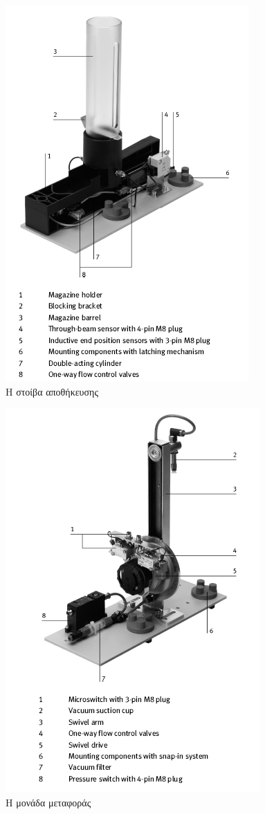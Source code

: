 \documentclass[a4paper,12pt,twoside]{report}
\begin{document}
				\begin{figure}[hp]
					\centering
					\includegraphics[scale=0.75]{StackModuleParts.png}
					\caption{Η στοίβα αποθήκευσης \cite{FestoStackMagazineModuleManual}}
					\label{φωτ:Η στοίβα αποθήκευσης από Festo}
				\end{figure}
				
				\begin{figure}[hp]
					\centering
					\includegraphics[scale=0.75]{ChangerModuleParts.png}
					\caption{Η μονάδα μεταφοράς \cite{FestoChangerModuleManual}}
					\label{φωτ:Η μονάδα μεταφοράς από Festo}
				\end{figure}
							
\end{document}
